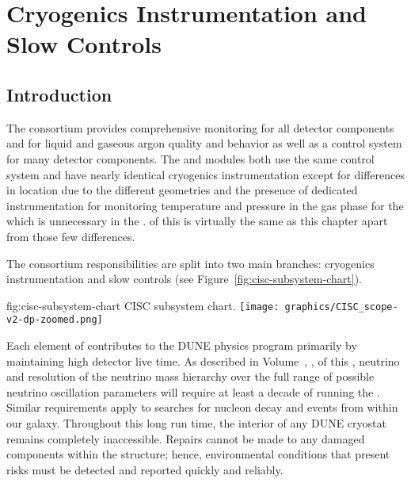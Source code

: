 \chapter{Cryogenics Instrumentation and Slow Controls}
\label{ch:dp-cisc}


\section{Introduction} 

The  consortium provides comprehensive monitoring for all detector components and for liquid and gaseous argon quality and behavior as well as a control system for many detector components.
The  and  modules both use the same control
system and have nearly identical cryogenics instrumentation except
for differences in location due to the different 
geometries and the presence of dedicated instrumentation for
monitoring temperature and pressure in the gas phase for the
 which is unnecessary in the .  
\spchcisc{} of this  is
virtually the same as this chapter apart from those few
differences.

The consortium responsibilities are split into 
two main branches: cryogenics instrumentation and slow controls (see Figure~\ref{fig:cisc-subsystem-chart}). 

\begin{dunefigure}{fig:cisc-subsystem-chart}
  {CISC subsystem chart.}
  \texttt{[image: graphics/CISC\_scope-v2-dp-zoomed.png]}
\end{dunefigure}

Each element of  contributes to the DUNE physics program primarily by maintaining high detector live time.  As described in Volume~\volnumberphysics{}, \voltitlephysics{}, of this , neutrino  and resolution of the neutrino mass hierarchy over the full range of possible neutrino oscillation parameters will require at least a decade of running the .  Similar requirements apply to searches for nucleon decay and  events from within our galaxy.  Throughout this long run time, the interior of any DUNE cryostat remains completely inaccessible.  Repairs cannot be made to any damaged components within the  structure; hence, environmental conditions that present risks must be detected and reported quickly and reliably. 
 
